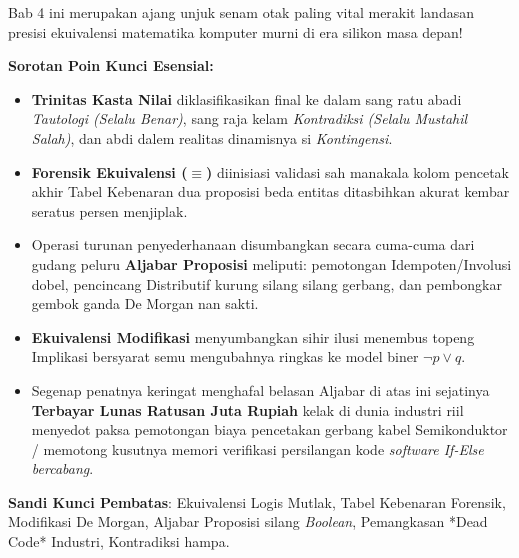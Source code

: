 \documentclass[../main]{subfiles}
\begin{document}
\begin{rangkuman}
Bab 4 ini merupakan ajang unjuk senam otak paling vital merakit landasan presisi ekuivalensi matematika komputer murni di era silikon masa depan!

\textbf{Sorotan Poin Kunci Esensial:}
\begin{itemize}
  \item \textbf{Trinitas Kasta Nilai} diklasifikasikan final ke dalam sang ratu abadi \textit{Tautologi (Selalu Benar)}, sang raja kelam \textit{Kontradiksi (Selalu Mustahil Salah)}, dan abdi dalem realitas dinamisnya si \textit{Kontingensi}.
  \item \textbf{Forensik Ekuivalensi ($\equiv$)} diinisiasi validasi sah manakala kolom pencetak akhir Tabel Kebenaran dua proposisi beda entitas ditasbihkan akurat kembar seratus persen menjiplak.
  \item Operasi turunan penyederhanaan disumbangkan secara cuma-cuma dari gudang peluru \textbf{Aljabar Proposisi} meliputi: pemotongan Idempoten/Involusi dobel, pencincang Distributif kurung silang silang gerbang, dan pembongkar gembok ganda De Morgan nan sakti.
  \item \textbf{Ekuivalensi Modifikasi} menyumbangkan sihir ilusi menembus topeng Implikasi bersyarat semu mengubahnya ringkas ke model biner $\neg p \lor q$.
  \item Segenap penatnya keringat menghafal belasan Aljabar di atas ini sejatinya \textbf{Terbayar Lunas Ratusan Juta Rupiah} kelak di dunia industri riil menyedot paksa pemotongan biaya pencetakan gerbang kabel Semikonduktor / memotong kusutnya memori verifikasi persilangan kode \textit{software If-Else bercabang}.
\end{itemize}

\textbf{Sandi Kunci Pembatas}: Ekuivalensi Logis Mutlak, Tabel Kebenaran Forensik, Modifikasi De Morgan, Aljabar Proposisi silang \textit{Boolean}, Pemangkasan *Dead Code* Industri, Kontradiksi hampa.
\end{rangkuman}

\ifSubfilesClassLoaded{
  \renewcommand{\bibname}{Daftar Pustaka}
  
  
}{}
\end{document}
